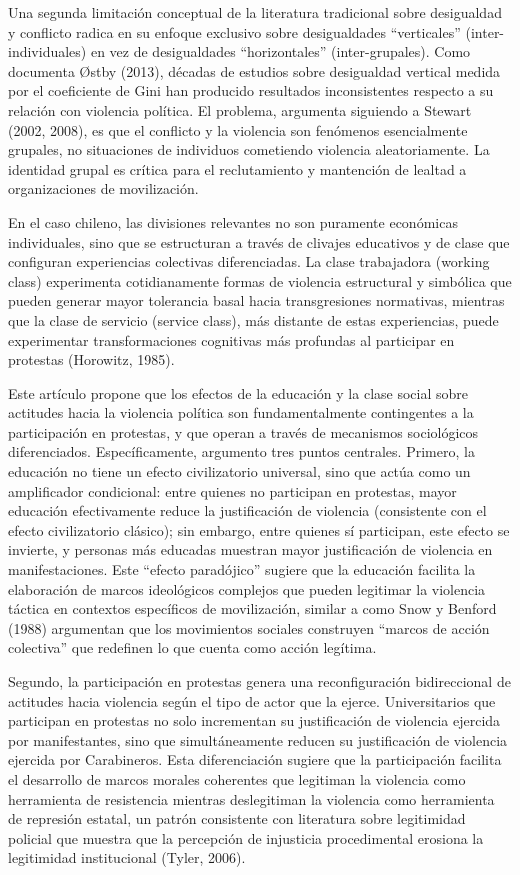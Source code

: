 \documentclass[
  12pt,
]{article}
\begin{document}
Una segunda limitación conceptual de la literatura tradicional sobre
desigualdad y conflicto radica en su enfoque exclusivo sobre
desigualdades ``verticales'' (inter-individuales) en vez de
desigualdades ``horizontales'' (inter-grupales). Como documenta Østby
(2013), décadas de estudios sobre desigualdad vertical medida por el
coeficiente de Gini han producido resultados inconsistentes respecto a
su relación con violencia política. El problema, argumenta siguiendo a
Stewart (2002, 2008), es que el conflicto y la violencia son fenómenos
esencialmente grupales, no situaciones de individuos cometiendo
violencia aleatoriamente. La identidad grupal es crítica para el
reclutamiento y mantención de lealtad a organizaciones de movilización.

En el caso chileno, las divisiones relevantes no son puramente
económicas individuales, sino que se estructuran a través de clivajes
educativos y de clase que configuran experiencias colectivas
diferenciadas. La clase trabajadora (working class) experimenta
cotidianamente formas de violencia estructural y simbólica que pueden
generar mayor tolerancia basal hacia transgresiones normativas, mientras
que la clase de servicio (service class), más distante de estas
experiencias, puede experimentar transformaciones cognitivas más
profundas al participar en protestas (Horowitz, 1985).

Este artículo propone que los efectos de la educación y la clase social
sobre actitudes hacia la violencia política son fundamentalmente
contingentes a la participación en protestas, y que operan a través de
mecanismos sociológicos diferenciados. Específicamente, argumento tres
puntos centrales. Primero, la educación no tiene un efecto civilizatorio
universal, sino que actúa como un amplificador condicional: entre
quienes no participan en protestas, mayor educación efectivamente reduce
la justificación de violencia (consistente con el efecto civilizatorio
clásico); sin embargo, entre quienes sí participan, este efecto se
invierte, y personas más educadas muestran mayor justificación de
violencia en manifestaciones. Este ``efecto paradójico'' sugiere que la
educación facilita la elaboración de marcos ideológicos complejos que
pueden legitimar la violencia táctica en contextos específicos de
movilización, similar a como Snow y Benford (1988) argumentan que los
movimientos sociales construyen ``marcos de acción colectiva'' que
redefinen lo que cuenta como acción legítima.

Segundo, la participación en protestas genera una reconfiguración
bidireccional de actitudes hacia violencia según el tipo de actor que la
ejerce. Universitarios que participan en protestas no solo incrementan
su justificación de violencia ejercida por manifestantes, sino que
simultáneamente reducen su justificación de violencia ejercida por
Carabineros. Esta diferenciación sugiere que la participación facilita
el desarrollo de marcos morales coherentes que legitiman la violencia
como herramienta de resistencia mientras deslegitiman la violencia como
herramienta de represión estatal, un patrón consistente con literatura
sobre legitimidad policial que muestra que la percepción de injusticia
procedimental erosiona la legitimidad institucional (Tyler, 2006).
\end{document}
